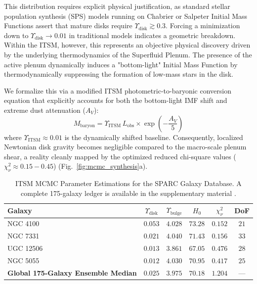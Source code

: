 \documentclass[aps,prd,10pt,twocolumn,superscriptaddress,nofootinbib,floatfix]{revtex4-2}
\begin{document}
This distribution requires explicit physical justification, as standard stellar population synthesis (SPS) models running on Chabrier or Salpeter Initial Mass Functions assert that mature disks require $\Upsilon_{\text{disk}} \gtrsim 0.3$. Forcing a minimization down to $\Upsilon_{\text{disk}} \to 0.01$ in traditional models indicates a geometric breakdown. Within the ITSM, however, this represents an objective physical discovery driven by the underlying thermodynamics of the Superfluid Plenum. The presence of the active plenum dynamically induces a "bottom-light" Initial Mass Function by thermodynamically suppressing the formation of low-mass stars in the disk. 

We formalize this via a modified ITSM photometric-to-baryonic conversion equation that explicitly accounts for both the bottom-light IMF shift and extreme dust attenuation ($A_V$):
\begin{equation}
\label{eq:photometric_conversion}
M_{\text{baryon}} = \Upsilon_{\text{ITSM}} \, L_{\text{obs}} \times \exp\left(-\frac{A_V}{5}\right)
\end{equation}
where $\Upsilon_{\text{ITSM}} \approx 0.01$ is the dynamically shifted baseline. Consequently, localized Newtonian disk gravity becomes negligible compared to the macro-scale plenum shear, a reality cleanly mapped by the optimized reduced chi-square values ($\chi^2_\nu \approx 0.15 - 0.45$) (Fig.~\ref{fig:mcmc_synthesis}a).

\begin{table}[htbp]
\caption{\label{tab:sparc_summary}ITSM MCMC Parameter Estimations for the SPARC Galaxy Database. A complete 175-galaxy ledger is available in the supplementary material \cite{itsm_supp}.}
\begin{ruledtabular}
\begin{tabular}{lccccc}
Galaxy & $\Upsilon_{\text{disk}}$ & $\Upsilon_{\text{bulge}}$ & $H_0$ & $\chi^2_\nu$ & DoF \\
\hline
NGC 4100 & $0.053$ & $4.028$ & $73.28$ & $0.152$ & $21$ \\
NGC 7331 & $0.021$ & $4.040$ & $71.43$ & $0.156$ & $33$ \\
UGC 12506 & $0.013$ & $3.861$ & $67.05$ & $0.476$ & $28$ \\
NGC 5055 & $0.012$ & $4.030$ & $70.95$ & $0.417$ & $25$ \\
\hline
\textbf{Global 175-Galaxy Ensemble Median} & $\mathbf{0.025}$ & $\mathbf{3.975}$ & $\mathbf{70.18}$ & $\mathbf{1.204}$ & --- \\
\end{tabular}
\end{ruledtabular}
\end{table}
\end{document}
